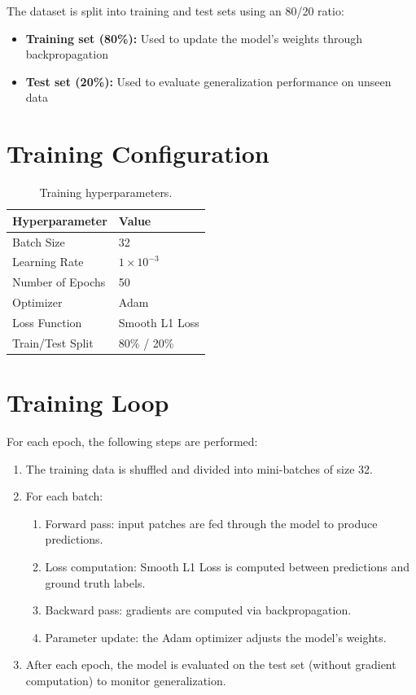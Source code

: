 \documentclass[12pt, a4paper]{report}
\begin{document}
The dataset is split into training and test sets using an 80/20 ratio:
\begin{itemize}
    \item \textbf{Training set (80\%):} Used to update the model's weights through backpropagation
    \item \textbf{Test set (20\%):} Used to evaluate generalization performance on unseen data
\end{itemize}

\section{Training Configuration}

\begin{table}[H]
\centering
\begin{tabular}{@{}ll@{}}
\toprule
\textbf{Hyperparameter} & \textbf{Value} \\
\midrule
Batch Size & 32 \\
Learning Rate & $1 \times 10^{-3}$ \\
Number of Epochs & 50 \\
Optimizer & Adam \\
Loss Function & Smooth L1 Loss \\
Train/Test Split & 80\% / 20\% \\
\bottomrule
\end{tabular}
\caption{Training hyperparameters.}
\label{tab:training_config}
\end{table}

\section{Training Loop}

For each epoch, the following steps are performed:
\begin{enumerate}
    \item The training data is shuffled and divided into mini-batches of size 32.
    \item For each batch:
    \begin{enumerate}
        \item Forward pass: input patches are fed through the model to produce predictions.
        \item Loss computation: Smooth L1 Loss is computed between predictions and ground truth labels.
        \item Backward pass: gradients are computed via backpropagation.
        \item Parameter update: the Adam optimizer adjusts the model's weights.
    \end{enumerate}
    \item After each epoch, the model is evaluated on the test set (without gradient computation) to monitor generalization.
\end{enumerate}
\end{document}
